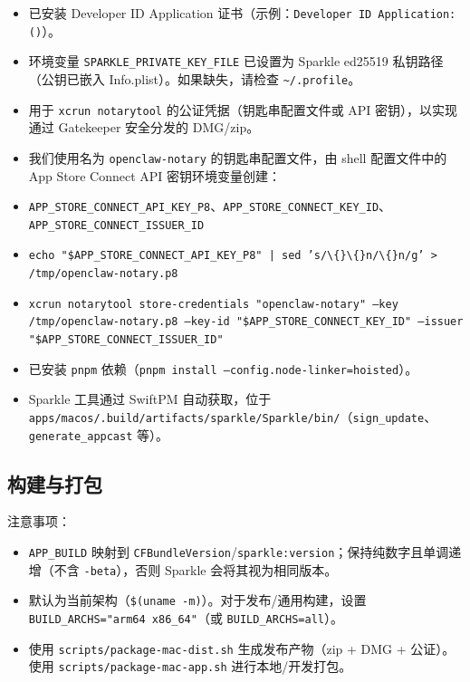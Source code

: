 \begin{itemize}
  \item 已安装 Developer ID Application 证书（示例：\texttt{Developer ID Application:  ()}）。
  \item 环境变量 \texttt{SPARKLE\_PRIVATE\_KEY\_FILE} 已设置为 Sparkle ed25519 私钥路径（公钥已嵌入 Info.plist）。如果缺失，请检查 \texttt{\textasciitilde{}/.profile}。
  \item 用于 \texttt{xcrun notarytool} 的公证凭据（钥匙串配置文件或 API 密钥），以实现通过 Gatekeeper 安全分发的 DMG/zip。
  \item 我们使用名为 \texttt{openclaw-notary} 的钥匙串配置文件，由 shell 配置文件中的 App Store Connect API 密钥环境变量创建：
  \item \texttt{APP\_STORE\_CONNECT\_API\_KEY\_P8}、\texttt{APP\_STORE\_CONNECT\_KEY\_ID}、\texttt{APP\_STORE\_CONNECT\_ISSUER\_ID}
  \item \texttt{echo "\$APP\_STORE\_CONNECT\_API\_KEY\_P8" | sed 's/\textbackslash\{\}\textbackslash\{\}n/\textbackslash\{\}n/g' > /tmp/openclaw-notary.p8}
  \item \texttt{xcrun notarytool store-credentials "openclaw-notary" --key /tmp/openclaw-notary.p8 --key-id "\$APP\_STORE\_CONNECT\_KEY\_ID" --issuer "\$APP\_STORE\_CONNECT\_ISSUER\_ID"}
  \item 已安装 \texttt{pnpm} 依赖（\texttt{pnpm install --config.node-linker=hoisted}）。
  \item Sparkle 工具通过 SwiftPM 自动获取，位于 \texttt{apps/macos/.build/artifacts/sparkle/Sparkle/bin/}（\texttt{sign\_update}、\texttt{generate\_appcast} 等）。
\end{itemize}


\subsection{构建与打包}


注意事项：

\begin{itemize}
  \item \texttt{APP\_BUILD} 映射到 \texttt{CFBundleVersion}/\texttt{sparkle:version}；保持纯数字且单调递增（不含 \texttt{-beta}），否则 Sparkle 会将其视为相同版本。
  \item 默认为当前架构（\texttt{\$(uname -m)}）。对于发布/通用构建，设置 \texttt{BUILD\_ARCHS="arm64 x86\_64"}（或 \texttt{BUILD\_ARCHS=all}）。
  \item 使用 \texttt{scripts/package-mac-dist.sh} 生成发布产物（zip + DMG + 公证）。使用 \texttt{scripts/package-mac-app.sh} 进行本地/开发打包。
\end{itemize}


